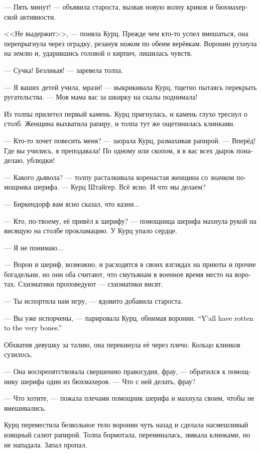 \documentclass[a4paper,12pt,fleqn]{book}\usepackage{cooltooltips}\usepackage{polyglossia}\setdefaultlanguage[babelshorthands=true]{russian}\setotherlanguage{english}\defaultfontfeatures{Ligatures=TeX,Mapping=tex-text} \usepackage{xcolor}\definecolor{lightgray}{HTML}{bbbbbb}\color{lightgray}\newcommand{\ml}[3]{\textenglish{\textcolor{black}{#3}}}
\begin{document}
--- Пять минут! --- объявила староста, вызвав новую волну криков и бюхмахерской активности.

<<Не выдержит>>, --- поняла Курц.
Прежде чем кто-то успел вмешаться, она перепрыгнула через оградку, резанув ножом по обеим верёвкам.
Воронин рухнула на землю и, ударившись головой о кирпич, лишилась чувств.

--- Сучка!
Безликая! --- заревела толпа.

--- Я ваших детей учила, мрази! --- выкрикивала Курц, тщетно пытаясь перекрыть ругательства.
--- Моя мама вас за шкирку на скалы поднимала!

Из толпы прилетел первый камень.
Курц пригнулась, и камень глухо треснул о столб.
Женщина выхватила рапиру, и толпа тут же ощетинилась клинками.

--- Кто-то хочет повесить меня? --- заорала Курц, размахивая рапирой.
--- Вперёд!
Где вы учились, я преподавала!
По одному или скопом, я в вас всех дырок понаделаю, ублюдки!

--- Какого дьявола? --- толпу расталкивала коренастая женщина со значком помощника шерифа.
--- Курц Штайгер.
Всё ясно.
И что мы делаем?

--- Биркендорф вам ясно сказал, что казни...

--- Кто, по-твоему, её привёл к шерифу? --- помощница шерифа махнула рукой на висящую на столбе прокламацию.
У Курц упало сердце.

--- Я не понимаю...

--- Ворон и шериф, возможно, и расходятся в своих взглядах на приюты и прочие богадельни, но они оба считают, что смутьянам в военное время место на воротах.
Схизматики проповедуют --- схизматики висят.

--- Ты испортила нам игру, --- ядовито добавила староста.

--- Вы уже испорчены, --- парировала Курц, обнимая воронин.
\ml{$0$}
{--- Вы все прогнили до костей.}
{``Y'all have rotten to the very bones.''}

Обхватив девушку за талию, она перекинула её через плечо.
Кольцо клинков сузилось.

--- Она воспрепятствовала свершению правосудия, фрау, --- обратился к помощнику шерифа один из бюхмахеров.
--- Что с ней делать, фрау?

--- Что хотите, --- пожала плечами помощник шерифа и махнула своим, чтобы не вмешивались.

Курц переместила безвольное тело воронин чуть назад и сделала насмешливый изящный салют рапирой.
Толпа бормотала, переминалась, звякала клинками, но не нападала.
Запал пропал.
\end{document}
